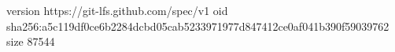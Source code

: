 version https://git-lfs.github.com/spec/v1
oid sha256:a5c119df0ce6b2284dcbd05cab5233971977d847412ce0af041b390f59039762
size 87544
